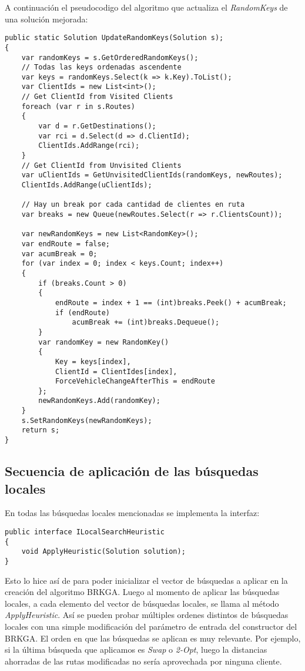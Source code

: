 \bigskip

A continuación el pseudocodigo del algoritmo que actualiza el \textit{RandomKeys} de una solución mejorada:

\begin{minipage}{\textwidth}
\begin{lstlisting}
public static Solution UpdateRandomKeys(Solution s);
{
	var randomKeys = s.GetOrderedRandomKeys();
	// Todas las keys ordenadas ascendente
	var keys = randomKeys.Select(k => k.Key).ToList();
	var ClientIds = new List<int>();
	// Get ClientId from Visited Clients
	foreach (var r in s.Routes)
	{
		var d = r.GetDestinations();
		var rci = d.Select(d => d.ClientId);
		ClientIds.AddRange(rci);
	}
	// Get ClientId from Unvisited Clients
	var uClientIds = GetUnvisitedClientIds(randomKeys, newRoutes);
	ClientIds.AddRange(uClientIds);

	// Hay un break por cada cantidad de clientes en ruta 
	var breaks = new Queue(newRoutes.Select(r => r.ClientsCount));

	var newRandomKeys = new List<RandomKey>();
	var endRoute = false;
	var acumBreak = 0;
	for (var index = 0; index < keys.Count; index++)
	{
		if (breaks.Count > 0)
		{		
			endRoute = index + 1 == (int)breaks.Peek() + acumBreak;
			if (endRoute)
				acumBreak += (int)breaks.Dequeue();
		}		
		var randomKey = new RandomKey()
		{
			Key = keys[index],
			ClientId = ClientIdes[index],
			ForceVehicleChangeAfterThis = endRoute
		};
		newRandomKeys.Add(randomKey);
	}
	s.SetRandomKeys(newRandomKeys);
	return s;
}
\end{lstlisting}
\end{minipage}

\subsection{Secuencia de aplicación de las búsquedas locales}

En todas las búsquedas locales mencionadas se implementa la interfaz:

\begin{lstlisting}
public interface ILocalSearchHeuristic
{
	void ApplyHeuristic(Solution solution);
}
\end{lstlisting}

Esto lo hice así de para poder inicializar el vector de búsquedas a aplicar en la creación del algoritmo BRKGA. Luego al momento de aplicar las búsquedas locales, a cada elemento del vector de búsquedas locales, se llama al método \textit{ApplyHeuristic}. Así se pueden probar múltiples ordenes distintos de búsquedas locales con una simple modificación del parámetro de entrada del constructor del BRKGA. El orden en que las búsquedas se aplican es muy relevante. Por ejemplo, si la última búsqueda que aplicamos es \textit{Swap} o \textit{2-Opt}, luego la distancias ahorradas de las rutas modificadas no sería aprovechada por ninguna cliente.


